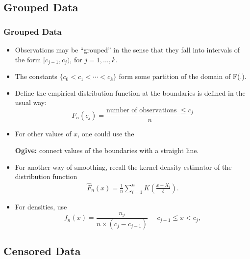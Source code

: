 \documentclass{beamer}
\begin{document}
\subsection{Grouped Data}
\begin{frame}%
\frametitle{Grouped Data}
\begin{itemize}
\item Observations may be ``grouped'' in the sense that they fall into intervals of the form $[c_{j-1}, c_j)$, for $j=1, \ldots, k$.
\item The constants $\{c_0 < c_1 < \cdots < c_k\}$ form some partition of the domain of F(.).
\item Define the empirical distribution function at the boundaries is defined in the usual way:
$$ F_n(c_j) = \frac{\text{number of observations } \le c_j}{n} $$
\item For other values of $x$, one could use the

\textbf{Ogive:} connect values of the boundaries with a straight line.
\item For another way of smoothing, recall the kernel density estimator of the distribution function
\begin{eqnarray*}
 \hat{F}_n(x) = \frac{1}{n} \sum_{i=1}^n K\left(\frac{x-X_i}{b}\right).
\end{eqnarray*}
 \item    For densities, use
$$ f_n(x) = \frac{n_j}{n \times (c_j - c_{j-1})}  \ \ \ \ \ \ c_{j-1} \le x < c_j,$$
\end{itemize}

\end{frame}

\subsection{Censored Data}
\end{document}
